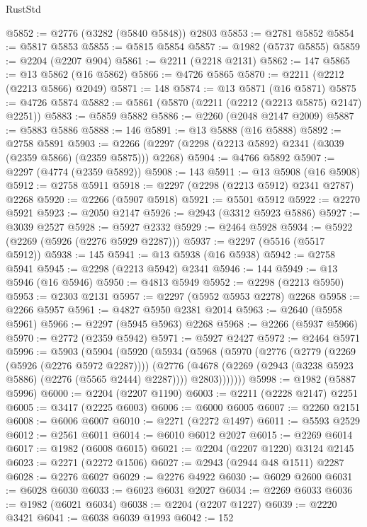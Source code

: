 \begin{lexlean}{RustStd}
\begin{coremodule}
{\begin{coremodule}
{{{{{{{{{{{{{{{{{{{{{{{{{{{{{{{{{{{{{{{{{{{{{{{{{{{{{{@5852 := @2776 (@3282 (@5840 @5848)) @2803
@5853 := @2781 @5852
@5854 := @5817 @5853
@5855 := @5815 @5854
@5857 := @1982 (@5737 @5855)
@5859 := @2204 (@2207 @904)
@5861 := @2211 (@2218 @2131)
@5862 := 147
@5865 := @13 @5862 (@16 @5862)
@5866 := @4726 @5865
@5870 := @2211 (@2212 (@2213 @5866) @2049)
@5871 := 148
@5874 := @13 @5871 (@16 @5871)
@5875 := @4726 @5874
@5882 := @5861 (@5870 (@2211 (@2212 (@2213 @5875) @2147) @2251))
@5883 := @5859 @5882
@5886 := @2260 (@2048 @2147 @2009)
@5887 := @5883 @5886
@5888 := 146
@5891 := @13 @5888 (@16 @5888)
@5892 := @2758 @5891
@5903 := @2266 (@2297 (@2298 (@2213 @5892) @2341 (@3039 (@2359 @5866) (@2359 @5875))) @2268)
@5904 := @4766 @5892
@5907 := @2297 (@4774 (@2359 @5892))
@5908 := 143
@5911 := @13 @5908 (@16 @5908)
@5912 := @2758 @5911
@5918 := @2297 (@2298 (@2213 @5912) @2341 @2787) @2268
@5920 := @2266 (@5907 @5918)
@5921 := @5501 @5912
@5922 := @2270 @5921
@5923 := @2050 @2147
@5926 := @2943 (@3312 @5923 @5886)
@5927 := @3039 @2527
@5928 := @5927 @2332
@5929 := @2464 @5928
@5934 := @5922 (@2269 (@5926 (@2276 @5929 @2287)))
@5937 := @2297 (@5516 (@5517 @5912))
@5938 := 145
@5941 := @13 @5938 (@16 @5938)
@5942 := @2758 @5941
@5945 := @2298 (@2213 @5942) @2341
@5946 := 144
@5949 := @13 @5946 (@16 @5946)
@5950 := @4813 @5949
@5952 := @2298 (@2213 @5950)
@5953 := @2303 @2131
@5957 := @2297 (@5952 @5953 @2278) @2268
@5958 := @2266 @5957
@5961 := @4827 @5950 @2381 @2014
@5963 := @2640 (@5958 @5961)
@5966 := @2297 (@5945 @5963) @2268
@5968 := @2266 (@5937 @5966)
@5970 := @2772 (@2359 @5942)
@5971 := @5927 @2427
@5972 := @2464 @5971
@5996 := @5903
    (@5904
      (@5920
        (@5934
          (@5968
            (@5970
              (@2776
                (@2779 (@2269 (@5926 (@2276 @5972 @2287))))
                (@2776
                  (@4678 (@2269 (@2943 (@3238 @5923 @5886) (@2276 (@5565 @2444) @2287))))
                  @2803)))))))
@5998 := @1982 (@5887 @5996)
@6000 := @2204 (@2207 @1190)
@6003 := @2211 (@2228 @2147) @2251
@6005 := @3417 (@2225 @6003)
@6006 := @6000 @6005
@6007 := @2260 @2151
@6008 := @6006 @6007
@6010 := @2271 (@2272 @1497)
@6011 := @5593 @2529
@6012 := @2561 @6011
@6014 := @6010 @6012 @2027
@6015 := @2269 @6014
@6017 := @1982 (@6008 @6015)
@6021 := @2204 (@2207 @1220) @3124 @2145
@6023 := @2271 (@2272 @1506)
@6027 := @2943 (@2944 @48 @1511) @2287
@6028 := @2276 @6027
@6029 := @2276 @4922
@6030 := @6029 @2600
@6031 := @6028 @6030
@6033 := @6023 @6031 @2027
@6034 := @2269 @6033
@6036 := @1982 (@6021 @6034)
@6038 := @2204 (@2207 @1227)
@6039 := @2220 @3421
@6041 := @6038 @6039 @1993
@6042 := 152
}}}}}}}}}}}}}}}}}}}}}}}}}}}}}}}}}}}}}}}}}}}}}}}}}}}}}}
\end{coremodule}}
\end{coremodule}
\end{lexlean}
